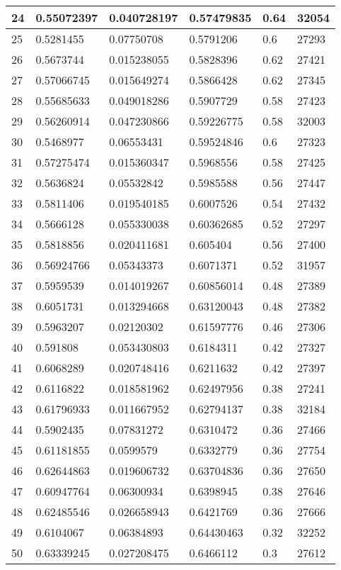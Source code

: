 \begin{longtable}{|l|l|l|l|l|l|}
24 & 0.55072397 & 0.040728197 & 0.57479835 & 0.64 & 32054 \\ \hline 
25 & 0.5281455 & 0.07750708 & 0.5791206 & 0.6 & 27293 \\ \hline 
26 & 0.5673744 & 0.015238055 & 0.5828396 & 0.62 & 27421 \\ \hline 
27 & 0.57066745 & 0.015649274 & 0.5866428 & 0.62 & 27345 \\ \hline 
28 & 0.55685633 & 0.049018286 & 0.5907729 & 0.58 & 27423 \\ \hline 
29 & 0.56260914 & 0.047230866 & 0.59226775 & 0.58 & 32003 \\ \hline 
30 & 0.5468977 & 0.06553431 & 0.59524846 & 0.6 & 27323 \\ \hline 
31 & 0.57275474 & 0.015360347 & 0.5968556 & 0.58 & 27425 \\ \hline 
32 & 0.5636824 & 0.05532842 & 0.5985588 & 0.56 & 27447 \\ \hline 
33 & 0.5811406 & 0.019540185 & 0.6007526 & 0.54 & 27432 \\ \hline 
34 & 0.5666128 & 0.055330038 & 0.60362685 & 0.52 & 27297 \\ \hline 
35 & 0.5818856 & 0.020411681 & 0.605404 & 0.56 & 27400 \\ \hline 
36 & 0.56924766 & 0.05343373 & 0.6071371 & 0.52 & 31957 \\ \hline 
37 & 0.5959539 & 0.014019267 & 0.60856014 & 0.48 & 27389 \\ \hline 
38 & 0.6051731 & 0.013294668 & 0.63120043 & 0.48 & 27382 \\ \hline 
39 & 0.5963207 & 0.02120302 & 0.61597776 & 0.46 & 27306 \\ \hline 
40 & 0.591808 & 0.053430803 & 0.6184311 & 0.42 & 27327 \\ \hline 
41 & 0.6068289 & 0.020748416 & 0.6211632 & 0.42 & 27397 \\ \hline 
42 & 0.6116822 & 0.018581962 & 0.62497956 & 0.38 & 27241 \\ \hline 
43 & 0.61796933 & 0.011667952 & 0.62794137 & 0.38 & 32184 \\ \hline 
44 & 0.5902435 & 0.07831272 & 0.6310472 & 0.36 & 27466 \\ \hline 
45 & 0.61181855 & 0.0599579 & 0.6332779 & 0.36 & 27754 \\ \hline 
46 & 0.62644863 & 0.019606732 & 0.63704836 & 0.36 & 27650 \\ \hline 
47 & 0.60947764 & 0.06300934 & 0.6398945 & 0.38 & 27646 \\ \hline 
48 & 0.62485546 & 0.026658943 & 0.6421769 & 0.36 & 27666 \\ \hline 
49 & 0.6104067 & 0.06384893 & 0.64430463 & 0.32 & 32252 \\ \hline 
50 & 0.63339245 & 0.027208475 & 0.6466112 & 0.3 & 27612 \\ \hline 
\end{longtable}